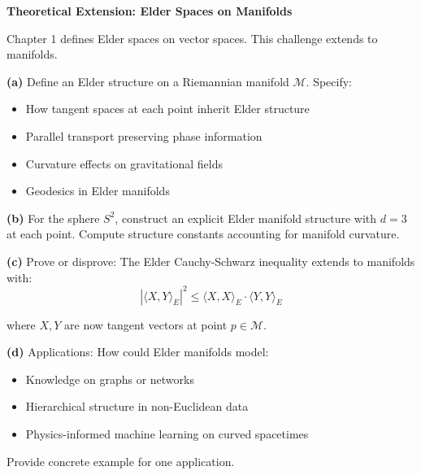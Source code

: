 \begin{challenge}
\textbf{Theoretical Extension: Elder Spaces on Manifolds}

Chapter 1 defines Elder spaces on vector spaces. This challenge extends to manifolds.

\textbf{(a)} Define an Elder structure on a Riemannian manifold $\mathcal{M}$. Specify:
\begin{itemize}
\item How tangent spaces at each point inherit Elder structure
\item Parallel transport preserving phase information
\item Curvature effects on gravitational fields
\item Geodesics in Elder manifolds
\end{itemize}

\textbf{(b)} For the sphere $S^2$, construct an explicit Elder manifold structure with $d=3$ at each point. Compute structure constants accounting for manifold curvature.

\textbf{(c)} Prove or disprove: The Elder Cauchy-Schwarz inequality extends to manifolds with:
$$|\langle X, Y \rangle_E|^2 \leq \langle X, X \rangle_E \cdot \langle Y, Y \rangle_E$$

where $X, Y$ are now tangent vectors at point $p \in \mathcal{M}$.

\textbf{(d)} Applications: How could Elder manifolds model:
\begin{itemize}
\item Knowledge on graphs or networks
\item Hierarchical structure in non-Euclidean data
\item Physics-informed machine learning on curved spacetimes
\end{itemize}

Provide concrete example for one application.
\end{challenge}

